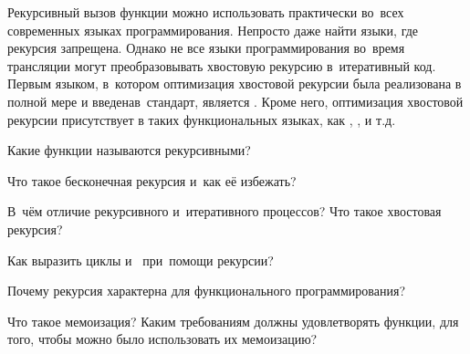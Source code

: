 Рекурсивный вызов функции можно использовать практически во~всех современных языках программирования. Непросто даже найти языки, где рекурсия запрещена. Однако не все языки программирования во~время трансляции могут преобразовывать хвостовую рекурсию в~итеративный код. Первым языком, в~котором оптимизация хвостовой рекурсии была реализована в полной мере и введенав~стандарт, является . Кроме него, оптимизация хвостовой рекурсии присутствует в таких функциональных языках, как , ,  и т.д.

\begin{Queeze}

  \item Какие функции называются рекурсивными?

  \item Что такое бесконечная рекурсия и~как её избежать?

  \item В~чём отличие рекурсивного и~итеративного процессов? Что такое хвостовая рекурсия?

  \item Как выразить циклы  и~ при~помощи рекурсии?

  \item Почему рекурсия характерна для функционального программирования?

  \item Что такое мемоизация? Каким требованиям должны удовлетворять функции, для того, чтобы можно было использовать их мемоизацию?
\end{Queeze}

